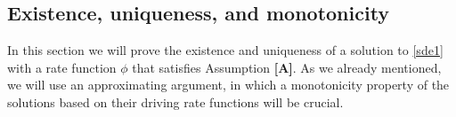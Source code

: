 \documentclass[12pt,reqno]{amsart}
\newcommand{\red}{\textcolor[rgb]{1.00,0.00,0.00}}
\newcommand{\blue}{\textcolor[rgb]{0.00,0.00,1.00}}
\newcommand{\green}{\textcolor[rgb]{0.00,0.70,.30}}
\theoremstyle{definition}
\theoremstyle{remark}
\begin{document}
\subsection{Existence, uniqueness, and monotonicity}
In this section we will prove the existence and uniqueness of a solution to \eqref{sde1} with a rate function $\phi$ that satisfies Assumption \textbf{[A]}. 
As we already mentioned, we will use an approximating argument, in which a monotonicity property of the solutions based on their driving rate functions 
will be crucial. %
\end{document}
